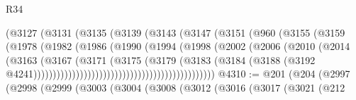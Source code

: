 \begin{lexlean}{R34}
\begin{coremodule}
                                        (@3127
                                          (@3131
                                            (@3135
                                              (@3139
                                                (@3143
                                                  (@3147
                                                    (@3151
                                                      (@960
                                                        (@3155
                                                          (@3159
                                                            (@1978
                                                              (@1982
                                                                (@1986
                                                                  (@1990
                                                                    (@1994
                                                                      (@1998
                                                                        (@2002
                                                                          (@2006
                                                                            (@2010
                                                                              (@2014
                                                                                (@3163
                                                                                  (@3167
                                                                                    (@3171
                                                                                      (@3175
                                                                                        (@3179
                                                                                          (@3183
                                                                                            (@3184
                                                                                              (@3188
                                                                                                (@3192
                                                                                                  @4241)))))))))))))))))))))))))))))))))))))))))))))))
@4310 := @201
    (@204
      (@2997
        (@2998
          (@2999
            (@3003
              (@3004
                (@3008
                  (@3012
                    (@3016
                      (@3017
                        (@3021
                          (@212

\end{coremodule}
\end{lexlean}
